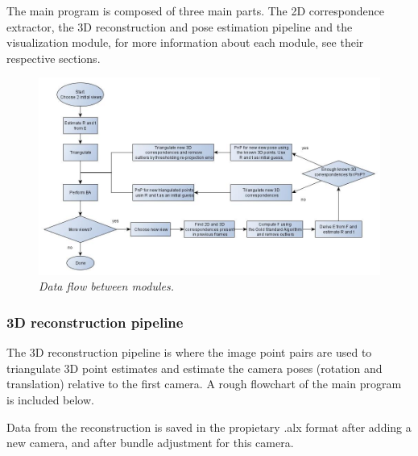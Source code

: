 The main program is composed of three main parts. The 2D correspondence extractor, the 3D reconstruction and pose estimation pipeline and the visualization module, for more information about each module, see their respective sections.



\begin{figure}[htb]
	\centering
	\includegraphics[width=160mm]{images/pipeline.jpg}
	\caption{\textit{Data flow between modules.}}
	\label{fig:block_overview_fig}  %
\end{figure}



\subsubsection{3D reconstruction pipeline}
The 3D reconstruction pipeline is where the image point pairs are used to triangulate 3D point estimates and estimate the camera poses (rotation and translation) relative to the first camera. A rough flowchart of the main program is included below.

Data from the reconstruction is saved in the propietary .alx format after adding a new camera, and after bundle adjustment for this camera.